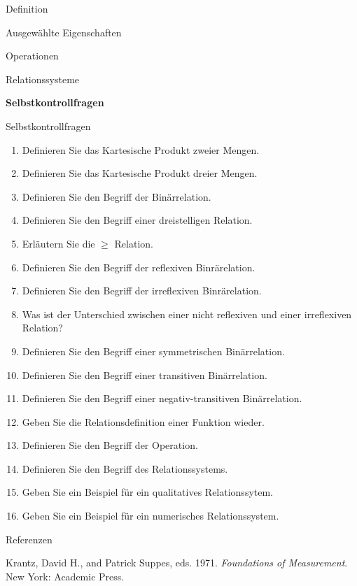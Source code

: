 \documentclass[
  8pt,
  ignorenonframetext,
]{beamer}
\providecommand{\tightlist}{%
  \setlength{\itemsep}{0pt}\setlength{\parskip}{0pt}}
\newlength{\cslhangindent}
\newlength{\cslentryspacingunit} %
\newenvironment{CSLReferences}[2] %
 {%
  \setlength{\parindent}{0pt}
  \ifodd #1
  \let\oldpar\par
  \def\par{\hangindent=\cslhangindent\oldpar}
  \fi
  \setlength{\parskip}{#2\cslentryspacingunit}
 }%
 {}
\begin{document}
\begin{frame}{}
\protect\hypertarget{section-7}{}
\vfill
\Large

Definition

Ausgewählte Eigenschaften

Operationen

Relationssysteme

\textbf{Selbstkontrollfragen} \vfill
\end{frame}

\begin{frame}{Selbstkontrollfragen}
\protect\hypertarget{selbstkontrollfragen}{}

\footnotesize

\begin{enumerate}
\tightlist
\item
  Definieren Sie das Kartesische Produkt zweier Mengen.
\item
  Definieren Sie das Kartesische Produkt dreier Mengen.
\item
  Definieren Sie den Begriff der Binärrelation.
\item
  Definieren Sie den Begriff einer dreistelligen Relation.
\item
  Erläutern Sie die \(\ge\) Relation.
\item
  Definieren Sie den Begriff der reflexiven Binrärelation.
\item
  Definieren Sie den Begriff der irreflexiven Binrärelation.
\item
  Was ist der Unterschied zwischen einer nicht reflexiven und einer
  irreflexiven Relation?
\item
  Definieren Sie den Begriff einer symmetrischen Binärrelation.
\item
  Definieren Sie den Begriff einer transitiven Binärrelation.
\item
  Definieren Sie den Begriff einer negativ-transitiven Binärrelation.
\item
  Geben Sie die Relationsdefinition einer Funktion wieder.
\item
  Definieren Sie den Begriff der Operation.
\item
  Definieren Sie den Begriff des Relationssystems.
\item
  Geben Sie ein Beispiel für ein qualitatives Relationssytem.
\item
  Geben Sie ein Beispiel für ein numerisches Relationssystem.
\end{enumerate}
\end{frame}

\begin{frame}{Referenzen}
\protect\hypertarget{referenzen}{}
\footnotesize

\hypertarget{refs}{}
\begin{CSLReferences}{1}{0}
\leavevmode{}%
Krantz, David H., and Patrick Suppes, eds. 1971. \emph{Foundations of
Measurement}. {New York}: {Academic Press}.

\end{CSLReferences}
\end{frame}
\end{document}
